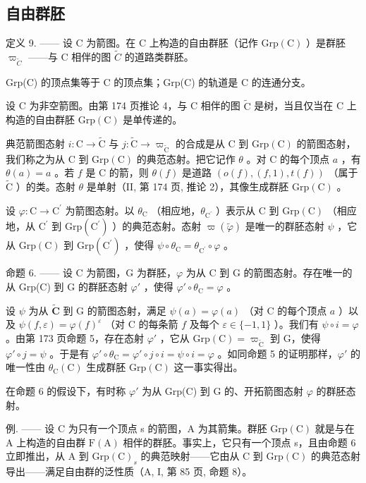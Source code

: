 \subsection{自由群胚}

定义 9. —— 设 C 为箭图。在 C 上构造的自由群胚（记作 \(\mathrm{Grp}(\mathrm{C})\) ）是群胚 \(\varpi_{\widetilde{C}}\) ——与 C 相伴的图 \(\widetilde{C}\) 的道路类群胚。

Grp(C) 的顶点集等于 C 的顶点集；Grp(C) 的轨道是 C 的连通分支。

设 C 为非空箭图。由第 174 页推论 4，与 C 相伴的图 \(\widetilde{\mathrm{C}}\) 是树，当且仅当在 C 上构造的自由群胚 \(\mathrm{Grp}(\mathrm{C})\) 是单传递的。

典范箭图态射 \(i\colon \mathrm{C}\to \widetilde{\mathrm{C}}\) 与 \(j\colon \widetilde{\mathrm{C}}\to \varpi_{\widetilde{\mathrm{C}}}\) 的合成是从 C 到 \(\mathrm{Grp}(\mathrm{C})\) 的箭图态射，我们称之为从 C 到 \(\mathrm{Grp}(\mathrm{C})\) 的典范态射。把它记作 \(\theta\) 。对 C 的每个顶点 \(a\) ，有 \(\theta (a) = a\) 。若 \(f\) 是 C 的箭，则 \(\theta (f)\) 是道路 \((o(f),(f,1),t(f))\) （属于 \(\widetilde{\mathrm{C}}\) ）的类。态射 \(\theta\) 是单射（II, 第 174 页, 推论 2），其像生成群胚 \(\mathrm{Grp}(\mathrm{C})\) 。

设 \(\varphi\colon\mathrm{C}\to\mathrm{C}^{\prime}\) 为箭图态射。以 \(\theta_{\mathrm{C}}\) （相应地，\(\theta_{\mathrm{C}^{\prime}}\) ）表示从 C 到 \(\mathrm{Grp}(\mathrm{C})\) （相应地，从 \(\mathrm{C}^{\prime}\) 到 \(\mathrm{Grp}(\mathrm{C}^{\prime})\) ）的典范态射。态射 \(\varpi(\widetilde{\varphi})\) 是唯一的群胚态射 \(\psi\) ，它从 \(\mathrm{Grp}(\mathrm{C})\) 到 \(\mathrm{Grp}(\mathrm{C}^{\prime})\) ，使得 \(\psi\circ\theta_{\mathrm{C}}=\theta_{\mathrm{C}^{\prime}}\circ\varphi\) 。

命题 6. —— 设 C 为箭图，G 为群胚，\(\varphi\) 为从 C 到 G 的箭图态射。存在唯一的从 Grp(C) 到 G 的群胚态射 \(\varphi'\) ，使得 \(\varphi' \circ \theta_{\mathrm{C}} = \varphi\) 。

设 \(\psi\) 为从 \(\widetilde{\mathbf{C}}\) 到 G 的箭图态射，满足 \(\psi(a) = \varphi(a)\) （对 C 的每个顶点 \(a\) ）以及 \(\psi(f, \varepsilon) = \varphi(f)^{\varepsilon}\) （对 C 的每条箭 \(f\) 及每个 \(\varepsilon \in \{-1, 1\}\) ）。我们有 \(\psi \circ i = \varphi\) 。由第 173 页命题 5，存在态射 \(\varphi'\) ，它从 \(\mathrm{Grp}(\mathrm{C}) = \varpi_{\widetilde{\mathrm{C}}}\) 到 G，使得 \(\varphi' \circ j = \psi\) 。于是有 \(\varphi' \circ \theta_{\mathrm{C}} = \varphi' \circ j \circ i = \psi \circ i = \varphi\) 。如同命题 5 的证明那样，\(\varphi'\) 的唯一性由 \(\theta_{\mathrm{C}}(\mathrm{C})\) 生成群胚 \(\mathrm{Grp}(\mathrm{C})\) 这一事实得出。

在命题 6 的假设下，有时称 \(\varphi'\) 为从 Grp(C) 到 G 的、开拓箭图态射 \(\varphi\) 的群胚态射。

例. —— 设 C 为只有一个顶点 s 的箭图，A 为其箭集。群胚 \(\mathrm{Grp}(\mathrm{C})\) 就是与在 A 上构造的自由群 \(\mathrm{F}(\mathrm{A})\) 相伴的群胚。事实上，它只有一个顶点 s，且由命题 6 立即推出，从 A 到 \(\mathrm{Grp}(\mathrm{C})_{s}\) 的典范映射——它由从 C 到 \(\mathrm{Grp}(\mathrm{C})\) 的典范态射导出——满足自由群的泛性质（A, I, 第 85 页, 命题 8）。

